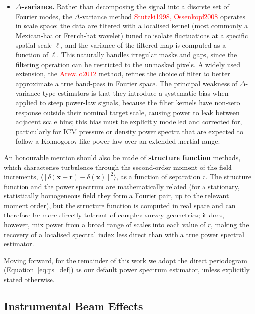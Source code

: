 \begin{itemize}
	\item \textbf{$\Delta$-variance.} Rather than decomposing the signal into a discrete set of Fourier modes, the $\Delta$-variance method \textcolor{red}{Stutzki1998, Ossenkopf2008} operates in scale space: the data are filtered with a localised kernel (most commonly a Mexican-hat or French-hat wavelet) tuned to isolate fluctuations at a specific spatial scale $\ell$, and the variance of the filtered map is computed as a function of $\ell$. This naturally handles irregular masks and gaps, since the filtering operation can be restricted to the unmasked pixels. A widely used extension, the \textcolor{red}{Arevalo2012} method, refines the choice of filter to better approximate a true band-pass in Fourier space. The principal weakness of $\Delta$-variance-type estimators is that they introduce a systematic bias when applied to steep power-law signals, because the filter kernels have non-zero response outside their nominal target scale, causing power to leak between adjacent scale bins; this bias must be explicitly modelled and corrected for, particularly for ICM pressure or density power spectra that are expected to follow a Kolmogorov-like power law over an extended inertial range.
\end{itemize}

An honourable mention should also be made of \textbf{structure function} methods, which characterise turbulence through the second-order moment of the field increments, $\langle [\delta(\mathbf{x} + \mathbf{r}) - \delta(\mathbf{x})]^2 \rangle$, as a function of separation $r$. The structure function and the power spectrum are mathematically related (for a stationary, statistically homogeneous field they form a Fourier pair, up to the relevant moment order), but the structure function is computed in real space and can therefore be more directly tolerant of complex survey geometries; it does, however, mix power from a broad range of scales into each value of $r$, making the recovery of a localised spectral index less direct than with a true power spectral estimator.

Moving forward, for the remainder of this work we adopt the direct periodogram (Equation~\ref{eq:ps_def}) as our default power spectrum estimator, unless explicitly stated otherwise.

\subsection{Instrumental Beam Effects}\label{Chap:assumptionsBeamSmoothingd}

